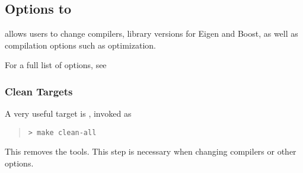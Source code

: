 \subsection{Options to }

\CmdStan allows users to change compilers, library versions for Eigen
and Boost, as well as compilation options such as optimization.

For a full list of options, see 



\subsubsection{Clean Targets}

A very useful target is , invoked as
%
\begin{quote}
\begin{Verbatim}[fontshape=sl]
> make clean-all
\end{Verbatim}
\end{quote}
%
This removes the \CmdStan tools. This step is necessary when changing
compilers or other  options.
